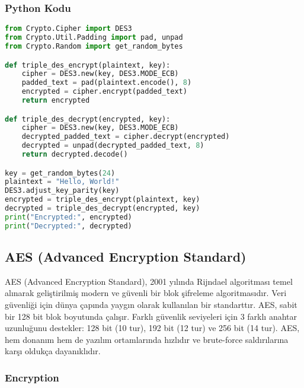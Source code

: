 \subsubsection{Python Kodu}

\begin{lstlisting}[language=Python]
from Crypto.Cipher import DES3
from Crypto.Util.Padding import pad, unpad
from Crypto.Random import get_random_bytes

def triple_des_encrypt(plaintext, key):
    cipher = DES3.new(key, DES3.MODE_ECB)
    padded_text = pad(plaintext.encode(), 8)
    encrypted = cipher.encrypt(padded_text)
    return encrypted

def triple_des_decrypt(encrypted, key):
    cipher = DES3.new(key, DES3.MODE_ECB)
    decrypted_padded_text = cipher.decrypt(encrypted)
    decrypted = unpad(decrypted_padded_text, 8)
    return decrypted.decode()

key = get_random_bytes(24)
plaintext = "Hello, World!"
DES3.adjust_key_parity(key)
encrypted = triple_des_encrypt(plaintext, key)
decrypted = triple_des_decrypt(encrypted, key)
print("Encrypted:", encrypted)
print("Decrypted:", decrypted)
\end{lstlisting}

\newpage

\subsection{AES (Advanced Encryption Standard)}

AES (Advanced Encryption Standard), 2001 yılında Rijndael algoritması temel alınarak geliştirilmiş modern ve güvenli bir blok şifreleme algoritmasıdır. Veri güvenliği için dünya çapında yaygın olarak kullanılan bir standarttır. AES, sabit bir 128 bit blok boyutunda çalışır. Farklı güvenlik seviyeleri için 3 farklı anahtar uzunluğunu destekler: 128 bit (10 tur), 192 bit (12 tur) ve 256 bit (14 tur). AES, hem donanım hem de yazılım ortamlarında hızlıdır ve brute-force saldırılarına karşı oldukça dayanıklıdır.

\subsubsection{Encryption}

